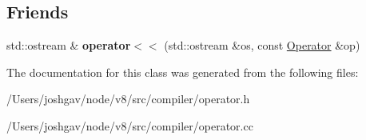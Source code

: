\subsection*{Friends}
\begin{DoxyCompactItemize}
\item 
std\+::ostream \& {\bfseries operator$<$$<$} (std\+::ostream \&os, const \hyperlink{classv8_1_1internal_1_1compiler_1_1_operator}{Operator} \&op)\hypertarget{classv8_1_1internal_1_1compiler_1_1_operator_a66c2d3b9a481a94bbff029086cf30a38}{}\label{classv8_1_1internal_1_1compiler_1_1_operator_a66c2d3b9a481a94bbff029086cf30a38}

\end{DoxyCompactItemize}


The documentation for this class was generated from the following files\+:\begin{DoxyCompactItemize}
\item 
/\+Users/joshgav/node/v8/src/compiler/operator.\+h\item 
/\+Users/joshgav/node/v8/src/compiler/operator.\+cc\end{DoxyCompactItemize}
